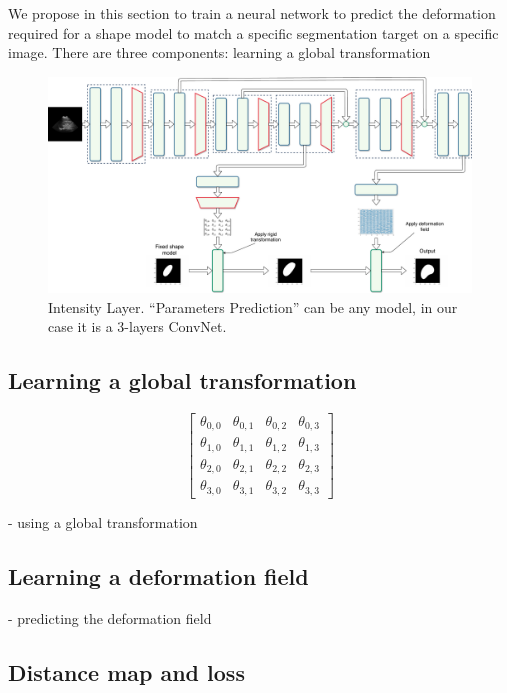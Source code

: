 We propose in this section to train a neural network to predict the deformation required for a shape model to match a specific segmentation target on a specific image. There are three components: learning a global transformation 

\begin{figure}[htbp]
	\includegraphics[width=\textwidth]{img_seg/deformation_network}
    \caption{Intensity Layer. ``Parameters Prediction'' can be any model, in our case it is a 3-layers ConvNet.}
    \label{fig:deform_network}
\end{figure}

\subsection{Learning a global transformation}

\begin{equation}
    \begin{bmatrix}
    \theta_{0, 0} & \theta_{0, 1} & \theta_{0, 2} & \theta_{0, 3} \\
    \theta_{1, 0} & \theta_{1, 1} & \theta_{1, 2} & \theta_{1, 3} \\
    \theta_{2, 0} & \theta_{2, 1} & \theta_{2, 2} & \theta_{2, 3} \\ 
    \theta_{3, 0} & \theta_{3, 1} & \theta_{3, 2} & \theta_{3, 3} 
    \end{bmatrix}
\end{equation}

- using a global transformation

\subsection{Learning a deformation field}

- predicting the deformation field

\subsection{Distance map and loss}

